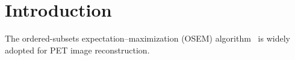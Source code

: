 \chapter{Introduction}
\label{ch:intro}

The ordered-subsets expectation–maximization (OSEM) algorithm~\cite{OSEM} is widely adopted for PET image reconstruction.

